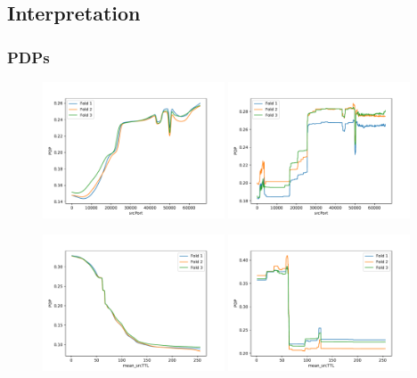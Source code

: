 \documentclass[10pt,sigconf,letterpaper,dvipsnames]{acmart}
\begin{document}



\subsection{Interpretation}
\subsubsection{PDPs}

\begin{figure}[p]
\includegraphics[width=0.48\textwidth]{../pdp_CAIA_backdoor_17/sourceTransportPort_nn.pdf}
\includegraphics[width=0.48\textwidth]{../pdp_CAIA_backdoor_17/sourceTransportPort_rf.pdf}

\includegraphics[width=0.48\textwidth]{../pdp_CAIA_backdoor_17/apply(mean(ipTTL),forward)_nn.pdf}
\includegraphics[width=0.48\textwidth]{../pdp_CAIA_backdoor_17/apply(mean(ipTTL),forward)_rf.pdf}


\end{figure}
\end{document}
